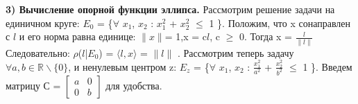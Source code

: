 \documentclass[14pt,a4paper]{article}
\begin{document}
	\newpage
	\begin{flushleft}
		{\vspace*{-3cm} \hspace{-2cm }\bf \Large 3) Вычисление опорной функции эллипса.}
		\newline
		\newline
		{\hspace*{-2cm} \large Рассмотрим решение задачи на единичном круге:}		
		\newline
		\newline
		{\hspace*{-1cm}\Large  $E_0$ = \{$\forall$ $x_1$, $x_2$ : $x_1^2$ + $x_2^2$ $\leq$ 1   \}.}
		\newline
		\newline
		{\hspace*{-2cm} \large Положим, что x сонаправлен с \Large{$l$ }\large и его норма равна единице:  }
		\newline
		\newline
		{\hspace*{-1cm} \Large $\|x\| $= 1,\quad x = c$l$, c $\geq$ 0.}
		\newline
		\newline
		{\hspace*{-2cm} \large Тогда \Large x = $\frac{l}{\|l\|}$}
		\newline
		\newline
		{\hspace*{-2cm} \large Следовательно: \Large $\rho$($l$|$E_0$) = $\langle l, x \rangle$ = $\|l\|$ .  }
		\newline
		\newline
		{\hspace*{-2cm} \large Рассмотрим теперь задачу  \Large $\forall a,b \in \mathbb{R}\backslash\{0\}$, \large и ненулевым 
		\newline	\hspace*{-2cm}	центром z:}
		\newline
		\newline
		{\hspace*{-1cm}\Large  $E_z$ = \{$\forall$ $x_1$, $x_2$ : $\frac{x_1^2}{a^2}$ + $\frac{x_2^2}{b^2}$
		 $\leq$ 1   \}.}
		\newline
		\newline
		{\hspace*{-2cm} \large Введем матрицу \Large С = $\begin{bmatrix} a& 0\\ 0& b
		\end{bmatrix}$ \large для удобства. 
}
\end{flushleft}
\end{document}
